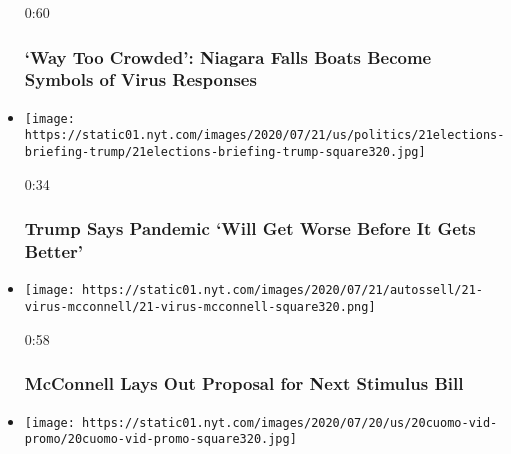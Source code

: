\begin{itemize}
  0:60

  \hypertarget{way-too-crowded-niagara-falls-boats-become-symbols-of-virus-responses}{%
  \subsubsection{`Way Too Crowded': Niagara Falls Boats Become Symbols
  of Virus
  Responses}\label{way-too-crowded-niagara-falls-boats-become-symbols-of-virus-responses}}
\item
  \href{https://www.nytimes.com/video/us/100000007250068/trump-says-virus-worse-before-better.html?action=click\&module=video-series-bar\&region=header\&pgtype=Article\&playlistId=video/coronavirus-news-update}{}

  \texttt{[image: https://static01.nyt.com/images/2020/07/21/us/politics/21elections-briefing-trump/21elections-briefing-trump-square320.jpg]}

  0:34

  \hypertarget{trump-says-pandemic-will-get-worse-before-it-gets-better}{%
  \subsubsection{Trump Says Pandemic `Will Get Worse Before It Gets
  Better'}\label{trump-says-pandemic-will-get-worse-before-it-gets-better}}
\item
  \href{https://www.nytimes.com/video/us/100000007250230/mcconnell-proposal-relief-package.html?action=click\&module=video-series-bar\&region=header\&pgtype=Article\&playlistId=video/coronavirus-news-update}{}

  \texttt{[image: https://static01.nyt.com/images/2020/07/21/autossell/21-virus-mcconnell/21-virus-mcconnell-square320.png]}

  0:58

  \hypertarget{mcconnell-lays-out-proposal-for-next-stimulus-bill}{%
  \subsubsection{McConnell Lays Out Proposal for Next Stimulus
  Bill}\label{mcconnell-lays-out-proposal-for-next-stimulus-bill}}
\item
  \href{https://www.nytimes.com/video/us/politics/100000007247561/cuomo-coronavirus-warning.html?action=click\&module=video-series-bar\&region=header\&pgtype=Article\&playlistId=video/coronavirus-news-update}{}

  \texttt{[image: https://static01.nyt.com/images/2020/07/20/us/20cuomo-vid-promo/20cuomo-vid-promo-square320.jpg]}


\end{itemize}
